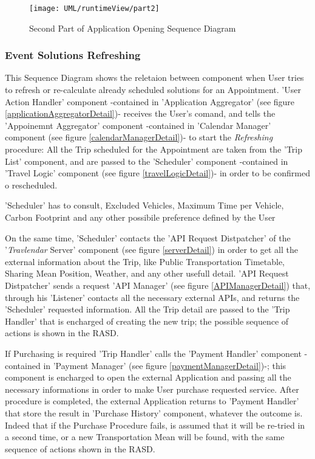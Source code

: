 	\vfill
	
	\begin{figure}[ht!]\ContinuedFloat
		\centering
		\texttt{[image: UML/runtimeView/part2]}
		\caption{Second Part of Application Opening Sequence Diagram}
		\label{loginRunTimeView}
	\end{figure}
	

\subsubsection{Event Solutions Refreshing}
	
	This Sequence Diagram shows the reletaion between component when User tries to refresh or re-calculate already scheduled solutions for an Appointment.
	'User Action Handler' component  -contained in 'Application Aggregator' (see figure \ref{applicationAggregatorDetail})- receives the User's comand, and tells the 'Appoinemnt Aggregator' component -contained in 'Calendar Manager' component (see figure \ref{calendarManagerDetail})- to start the \textsl{Refreshing} procedure:
	All the Trip scheduled for the Appointment are taken from the 'Trip List' component, and are passed to the 'Scheduler' component  -contained in 'Travel Logic' component (see figure \ref{travelLogicDetail})-  in order to be confirmed o rescheduled.
	
	'Scheduler' has to consult, Excluded Vehicles, Maximum Time per Vehicle, Carbon Footprint and any other possibile preference defined by the User
	
	On the same time, 'Scheduler' contacts the 'API Request Distpatcher' of the '\textit{Travlendar} Server' component (see figure \ref{serverDetail}) in order to get all the external information about the Trip, like Public Transportation Timetable, Sharing Mean Position, Weather, and any other usefull detail.
	'API Request Distpatcher' sends a request 'API Manager' (see figure \ref{APIManagerDetail}) that, through his 'Listener' contacts all the necessary external APIs, and returns the 'Scheduler' requested information.
	All the Trip detail are passed to the 'Trip Handler' that is encharged of creating the new trip; the possible sequence of actions is shown in the RASD.
	
	If Purchasing is required 'Trip Handler' calls the 'Payment Handler' component  -contained in 'Payment Manager' (see figure \ref{paymentManagerDetail})-; this component is encharged to open the external Application and passing all the necessary informations in order to make User purchase requested service.
	After procedure is completed, the external Application returns to 'Payment Handler' that store the result in 'Purchase History' component, whatever the outcome is.
	Indeed that if the Purchase Procedure fails, is assumed that it will be re-tried in a second time, or a new Transportation Mean will be found, with the same sequence of actions shown in the RASD.
	

